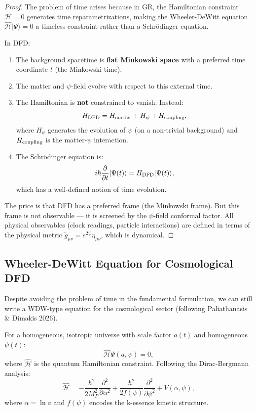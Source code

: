 \documentclass[11pt,a4paper]{article}
\begin{document}
\begin{proof}
The problem of time arises because in GR, the Hamiltonian constraint $\mathcal{H} = 0$ generates time reparametrizations, making the Wheeler-DeWitt equation $\hat{\mathcal{H}}|\Psi\rangle = 0$ a timeless constraint rather than a Schr\"{o}dinger equation.

In DFD:
\begin{enumerate}
\item The background spacetime is \textbf{flat Minkowski space} with a preferred time coordinate $t$ (the Minkowski time).
\item The matter and $\psi$-field evolve with respect to this external time.
\item The Hamiltonian is \textbf{not} constrained to vanish. Instead:
\begin{equation}
H_{\rm DFD} = H_{\rm matter} + H_\psi + H_{\rm coupling},
\end{equation}
where $H_\psi$ generates the evolution of $\psi$ (on a non-trivial background) and $H_{\rm coupling}$ is the matter-$\psi$ interaction.
\item The Schr\"{o}dinger equation is:
\begin{equation}
i\hbar\frac{\partial}{\partial t}|\Psi(t)\rangle = H_{\rm DFD}|\Psi(t)\rangle,
\end{equation}
which has a well-defined notion of time evolution.
\end{enumerate}

The price is that DFD has a preferred frame (the Minkowski frame). But this frame is not observable --- it is screened by the $\psi$-field conformal factor. All physical observables (clock readings, particle interactions) are defined in terms of the physical metric $\tilde{g}_{\mu\nu} = e^{2\psi}\eta_{\mu\nu}$, which is dynamical.
\end{proof}

\subsection{Wheeler-DeWitt Equation for Cosmological DFD}

Despite avoiding the problem of time in the fundamental formulation, we can still write a WDW-type equation for the cosmological sector (following Paliathanasis \& Dimakis 2026).

For a homogeneous, isotropic universe with scale factor $a(t)$ and homogeneous $\psi(t)$:
\begin{equation}
\hat{\mathcal{H}}\Psi(a, \psi) = 0,
\end{equation}
where $\hat{\mathcal{H}}$ is the quantum Hamiltonian constraint. Following the Dirac-Bergmann analysis:
\begin{equation}
\hat{\mathcal{H}} = -\frac{\hbar^2}{2M_P^2}\frac{\partial^2}{\partial\alpha^2} + \frac{\hbar^2}{2f(\psi)}\frac{\partial^2}{\partial\psi^2} + V(\alpha, \psi),
\end{equation}
where $\alpha = \ln a$ and $f(\psi)$ encodes the k-essence kinetic structure.
\end{document}
